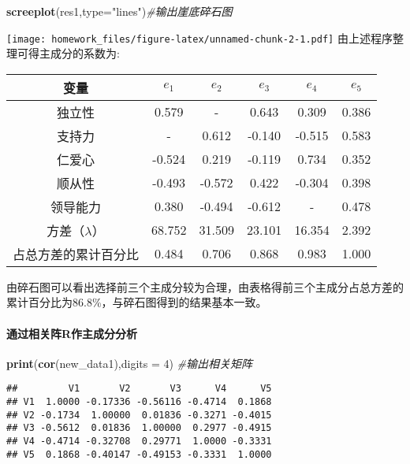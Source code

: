 \documentclass[
]{article}
\newenvironment{Shaded}{\begin{snugshade}}{\end{snugshade}}
\newcommand{\CommentTok}[1]{\textcolor[rgb]{0.56,0.35,0.01}{\textit{#1}}}
\newcommand{\DataTypeTok}[1]{\textcolor[rgb]{0.13,0.29,0.53}{#1}}
\newcommand{\DecValTok}[1]{\textcolor[rgb]{0.00,0.00,0.81}{#1}}
\newcommand{\KeywordTok}[1]{\textcolor[rgb]{0.13,0.29,0.53}{\textbf{#1}}}
\newcommand{\NormalTok}[1]{#1}
\newcommand{\StringTok}[1]{\textcolor[rgb]{0.31,0.60,0.02}{#1}}
\begin{document}
\begin{Shaded}
\begin{Highlighting}[]
\KeywordTok{screeplot}\NormalTok{(res1,}\DataTypeTok{type=}\StringTok{"lines"}\NormalTok{)}\CommentTok{#输出崖底碎石图}
\end{Highlighting}
\end{Shaded}

\texttt{[image: homework\_files/figure-latex/unnamed-chunk-2-1.pdf]}
由上述程序整理可得主成分的系数为:

\begin{longtable}[]{@{}cccccc@{}}
\toprule
变量 & \(e_{1}\) & \(e_{2}\) & \(e_{3}\) & \(e_{4}\) &
\(e_{5}\)\tabularnewline
\midrule
\endhead
独立性 & 0.579 & - & 0.643 & 0.309 & 0.386\tabularnewline
支持力 & - & 0.612 & -0.140 & -0.515 & 0.583\tabularnewline
仁爱心 & -0.524 & 0.219 & -0.119 & 0.734 & 0.352\tabularnewline
顺从性 & -0.493 & -0.572 & 0.422 & -0.304 & 0.398\tabularnewline
领导能力 & 0.380 & -0.494 & -0.612 & - & 0.478\tabularnewline
方差（$\lambda$） & 68.752 & 31.509 & 23.101 & 16.354 &
2.392\tabularnewline
占总方差的累计百分比 & 0.484 & 0.706 & 0.868 & 0.983 &
1.000\tabularnewline
\bottomrule
\end{longtable}

由碎石图可以看出选择前三个主成分较为合理，由表格得前三个主成分占总方差的累计百分比为86.8\%，与碎石图得到的结果基本一致。

\hypertarget{ux901aux8fc7ux76f8ux5173ux9635rux4f5cux4e3bux6210ux5206ux5206ux6790}{%
\paragraph{通过相关阵R作主成分分析}\label{ux901aux8fc7ux76f8ux5173ux9635rux4f5cux4e3bux6210ux5206ux5206ux6790}}

\begin{Shaded}
\begin{Highlighting}[]
\KeywordTok{print}\NormalTok{(}\KeywordTok{cor}\NormalTok{(new_data1),}\DataTypeTok{digits =} \DecValTok{4}\NormalTok{) }\CommentTok{#输出相关矩阵}
\end{Highlighting}
\end{Shaded}

\begin{verbatim}
##         V1       V2       V3      V4      V5
## V1  1.0000 -0.17336 -0.56116 -0.4714  0.1868
## V2 -0.1734  1.00000  0.01836 -0.3271 -0.4015
## V3 -0.5612  0.01836  1.00000  0.2977 -0.4915
## V4 -0.4714 -0.32708  0.29771  1.0000 -0.3331
## V5  0.1868 -0.40147 -0.49153 -0.3331  1.0000
\end{verbatim}
\end{document}
